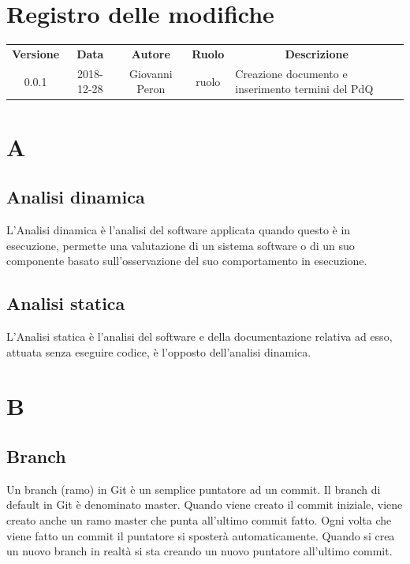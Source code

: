 \documentclass[11pt,a4paper]{article}
\begin{document}
	
	\newpage
	\section*{\centering Registro delle modifiche}
	\begin{tabularx}{\textwidth}{ c | c | c | c | X }
		\rowcolor{LightBlue}
		\color{white}\bfseries Versione & \color{white}\bfseries Data & \color{white}\bfseries Autore & \color{white}\bfseries Ruolo & \multicolumn{1}{c}{\color{white}\bfseries Descrizione}\\[0.25cm]
		0.0.1 & 2018-12-28 & Giovanni Peron & ruolo & Creazione documento e \newline inserimento termini del PdQ \\ \hline
	
	\end{tabularx}
	\newpage
	\setcounter{secnumdepth}{0}
	\tableofcontents
	\newpage
	\section{A}
	\subsection{Analisi dinamica}
		L'Analisi dinamica è l'analisi del software applicata quando questo è in esecuzione, permette una valutazione di un sistema software o di un suo componente basato sull’osservazione del suo comportamento in esecuzione.
	
	\subsection{Analisi statica}
L'Analisi statica è l'analisi del software e della documentazione relativa ad esso, attuata senza eseguire codice, è l'opposto dell'analisi dinamica.
	\section{B}
	\subsection{Branch}
	Un branch (ramo) in Git è un semplice puntatore ad un commit. Il branch di default in Git è denominato master. Quando viene creato il commit iniziale, viene creato anche un ramo master che punta all'ultimo commit fatto. Ogni volta che viene fatto un commit il puntatore si sposterà automaticamente. Quando si crea un nuovo branch in realtà si sta creando un nuovo puntatore all'ultimo commit.
\end{document}
